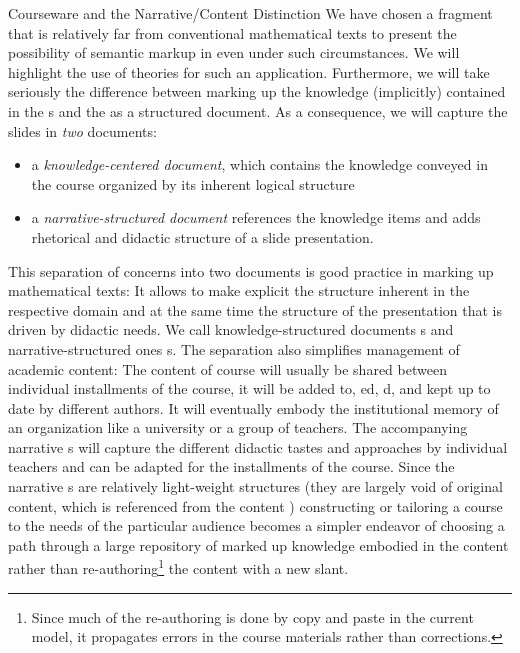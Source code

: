 \begin{tchapter}[id=courseware]{Courseware and the Narrative/Content Distinction}
We have chosen a fragment that is relatively far from conventional mathematical
texts to present the possibility of semantic markup in {\omdoc} even under such
circumstances.  We will highlight the use of {\omdoc} theories for
such an application. Furthermore, we will take seriously the difference between
marking up the knowledge (implicitly) contained in the {s} and the
{} as a structured
document. As a consequence, we will capture the slides in {\emph{two}} documents:

\begin{itemize}
\item a {\emph{knowledge-centered document}}, which contains
  the knowledge conveyed in the course organized by its inherent logical structure
\item a {\emph{narrative-structured document}}
  references the knowledge items and adds rhetorical and didactic structure of a
  slide presentation.
\end{itemize}
This separation of concerns into two documents is good practice in marking up mathematical
texts: It allows to make explicit the structure inherent in the respective domain and at
the same time the structure of the presentation that is driven by didactic needs. We
call knowledge-structured documents {s} and narrative-structured
ones {s}.  The separation also simplifies management of academic
content: The content {\omdoc} of course will usually be shared
between individual installments of the course, it will be added to,
{ed}, {d}, and kept up to date by different
authors. It will eventually embody the institutional memory of an organization like a
university or a group of teachers.  The accompanying narrative {\omdoc}s will capture the
different didactic tastes and approaches by individual teachers and can be adapted for the
installments of the course. Since the narrative {\omdoc}s are relatively light-weight
structures (they are largely void of original content, which is referenced from the
content {\omdoc}) constructing or tailoring a course to the needs of the particular
audience becomes a simpler endeavor of choosing a path through a large repository of
marked up knowledge embodied in the content {\omdoc} rather than
re-authoring\footnote{Since much of the re-authoring is done by copy and paste in the
  current model, it propagates errors in the course materials rather than corrections.}
the content with a new slant.


\end{tchapter}
